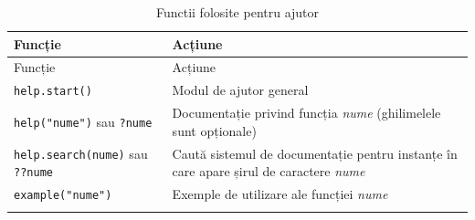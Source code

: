 \documentclass[]{article}
\begin{document}
\begin{longtable}[]{@{}ll@{}}
\caption{Functii folosite pentru ajutor}\tabularnewline
\toprule
\begin{minipage}[b]{0.27\columnwidth}\raggedright\strut
Funcție\strut
\end{minipage} & \begin{minipage}[b]{0.34\columnwidth}\raggedright\strut
Acțiune\strut
\end{minipage}\tabularnewline
\midrule
\endfirsthead
\toprule
\begin{minipage}[b]{0.27\columnwidth}\raggedright\strut
Funcție\strut
\end{minipage} & \begin{minipage}[b]{0.34\columnwidth}\raggedright\strut
Acțiune\strut
\end{minipage}\tabularnewline
\midrule
\endhead
\begin{minipage}[t]{0.27\columnwidth}\raggedright\strut
\texttt{help.start()}\strut
\end{minipage} & \begin{minipage}[t]{0.34\columnwidth}\raggedright\strut
Modul de ajutor general\strut
\end{minipage}\tabularnewline
\begin{minipage}[t]{0.27\columnwidth}\raggedright\strut
\texttt{help("nume")} sau \texttt{?nume}\strut
\end{minipage} & \begin{minipage}[t]{0.34\columnwidth}\raggedright\strut
Documentație privind funcția \emph{nume} (ghilimelele sunt
opționale)\strut
\end{minipage}\tabularnewline
\begin{minipage}[t]{0.27\columnwidth}\raggedright\strut
\texttt{help.search(nume)} sau \texttt{??nume}\strut
\end{minipage} & \begin{minipage}[t]{0.34\columnwidth}\raggedright\strut
Caută sistemul de documentație pentru instanțe în care apare șirul de
caractere \emph{nume}\strut
\end{minipage}\tabularnewline
\begin{minipage}[t]{0.27\columnwidth}\raggedright\strut
\texttt{example("nume")}\strut
\end{minipage} & \begin{minipage}[t]{0.34\columnwidth}\raggedright\strut
Exemple de utilizare ale funcției \emph{nume}\strut
\end{minipage}\tabularnewline
\begin{minipage}[t]{0.27\columnwidth}\raggedright\strut

\end{minipage}
\end{longtable}
\end{document}
